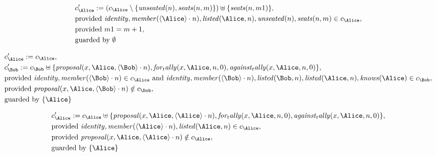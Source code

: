 \begin{align*}
&
c'_
{
\Alice
}
 := 
(c_
{
\Alice
}
 \setminus 
\{
\mathit{
unseated
}
(
n
)
,
\mathit{
seats
}
(
n
,
m
)
\}
) \uplus 
\{
\mathit{
seats
}
(
n
,
m1
)
\}
,\\
&
\text{provided } 
\mathit{
identity
}
,
\mathit{
member
}
(
\langle
\Alice
\rangle
\cdot
n
)
,
\mathit{
listed
}
(
\Alice
,
n
)
,
\mathit{
unseated
}
(
n
)
,
\mathit{
seats
}
(
n
,
m
)
 \in c_
{
\Alice
}
,\\
&
\text{provided } 
m1
=
m
+ 1
,\\
&
\text{guarded by } \emptyset
\end{align*}

\begin{align*}
&
c'_
{
\Alice
}
 := 
c_
{
\Alice
}
,\\
&
c'_
{
\Bob
}
 := 
c_
{
\Bob
}
 \uplus 
\{
\mathit{
proposal
}
(
x
,
\Alice
,
\langle
\Bob
\rangle
\cdot
n
)
,
\mathit{
for_tally
}
(
x
,
\Alice
,
n
,
0
)
,
\mathit{
against_tally
}
(
x
,
\Alice
,
n
,
0
)
\}
,\\
&
\text{provided } 
\mathit{
identity
}
,
\mathit{
member
}
(
\langle
\Bob
\rangle
\cdot
n
)
 \in c_
{
\Alice
}
 \text{ and } 
\mathit{
identity
}
,
\mathit{
member
}
(
\langle
\Bob
\rangle
\cdot
n
)
,
\mathit{
listed
}
(
\Bob
,
n
)
,
\mathit{
listed
}
(
\Alice
,
n
)
,
\mathit{
knows
}
(
\Alice
)
 \in c_
{
\Bob
}
,\\
&
\text{provided } 
\mathit{
proposal
}
(
x
,
\Alice
,
\langle
\Bob
\rangle
\cdot
n
)
 \notin c_
{
\Bob
}
,\\
&
\text{guarded by } \{
\Alice
\}
\end{align*}

\begin{align*}
&
c'_
{
\Alice
}
 := 
c_
{
\Alice
}
 \uplus 
\{
\mathit{
proposal
}
(
x
,
\Alice
,
\langle
\Alice
\rangle
\cdot
n
)
,
\mathit{
for_tally
}
(
x
,
\Alice
,
n
,
0
)
,
\mathit{
against_tally
}
(
x
,
\Alice
,
n
,
0
)
\}
,\\
&
\text{provided } 
\mathit{
identity
}
,
\mathit{
member
}
(
\langle
\Alice
\rangle
\cdot
n
)
,
\mathit{
listed
}
(
\Alice
,
n
)
 \in c_
{
\Alice
}
,\\
&
\text{provided } 
\mathit{
proposal
}
(
x
,
\Alice
,
\langle
\Alice
\rangle
\cdot
n
)
 \notin c_
{
\Alice
}
,\\
&
\text{guarded by } \{
\Alice
\}
\end{align*}

